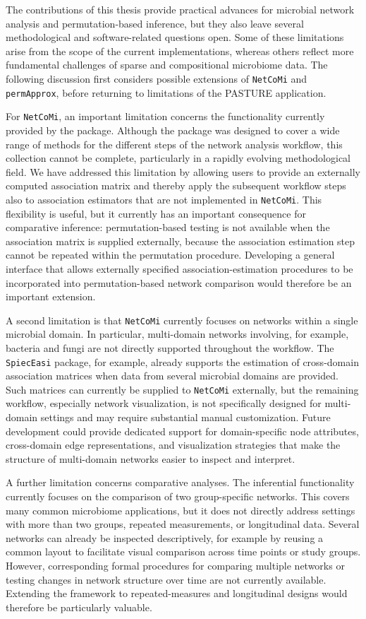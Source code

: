 The contributions of this thesis provide practical advances for microbial network analysis and permutation-based inference, but they also leave several methodological and software-related questions open. Some of these limitations arise from the scope of the current implementations, whereas others reflect more fundamental challenges of sparse and compositional microbiome data. The following discussion first considers possible extensions of \texttt{NetCoMi} and \texttt{permApprox}, before returning to limitations of the PASTURE application.

For \texttt{NetCoMi}, an important limitation concerns the functionality currently provided by the package. Although the package was designed to cover a wide range of methods for the different steps of the network analysis workflow, this collection cannot be complete, particularly in a rapidly evolving methodological field. We have addressed this limitation by allowing users to provide an externally computed association matrix and thereby apply the subsequent workflow steps also to association estimators that are not implemented in \texttt{NetCoMi}. This flexibility is useful, but it currently has an important consequence for comparative inference: permutation-based testing is not available when the association matrix is supplied externally, because the association estimation step cannot be repeated within the permutation procedure. Developing a general interface that allows externally specified association-estimation procedures to be incorporated into permutation-based network comparison would therefore be an important extension.

A second limitation is that \texttt{NetCoMi} currently focuses on networks within a single microbial domain. In particular, multi-domain networks involving, for example, bacteria and fungi are not directly supported throughout the workflow. The \texttt{SpiecEasi} package, for example, already supports the estimation of cross-domain association matrices when data from several microbial domains are provided. Such matrices can currently be supplied to \texttt{NetCoMi} externally, but the remaining workflow, especially network visualization, is not specifically designed for multi-domain settings and may require substantial manual customization. Future development could provide dedicated support for domain-specific node attributes, cross-domain edge representations, and visualization strategies that make the structure of multi-domain networks easier to inspect and interpret.

A further limitation concerns comparative analyses. The inferential functionality currently focuses on the comparison of two group-specific networks. This covers many common microbiome applications, but it does not directly address settings with more than two groups, repeated measurements, or longitudinal data. Several networks can already be inspected descriptively, for example by reusing a common layout to facilitate visual comparison across time points or study groups. However, corresponding formal procedures for comparing multiple networks or testing changes in network structure over time are not currently available. Extending the framework to repeated-measures and longitudinal designs would therefore be particularly valuable.

